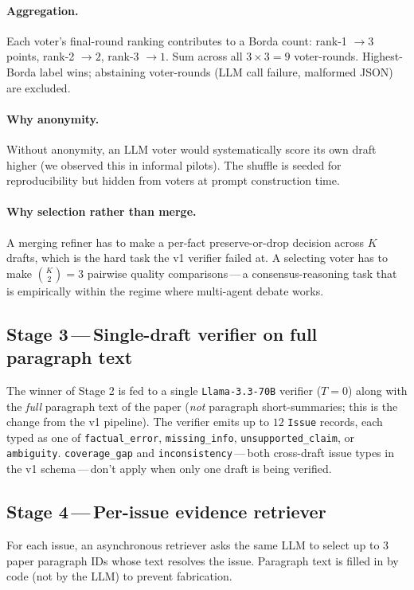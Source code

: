 \documentclass[11pt,a4paper]{article}
\begin{document}
\paragraph{Aggregation.}
Each voter's final-round ranking contributes to a Borda count: rank-1
$\to 3$ points, rank-2 $\to 2$, rank-3 $\to 1$. Sum across all
$3 \times 3 = 9$ voter-rounds. Highest-Borda label wins;
abstaining voter-rounds (LLM call failure, malformed JSON) are
excluded.

\paragraph{Why anonymity.}
Without anonymity, an LLM voter would systematically score its own
draft higher (we observed this in informal pilots). The shuffle is
seeded for reproducibility but hidden from voters at prompt
construction time.

\paragraph{Why selection rather than merge.}
A merging refiner has to make a per-fact preserve-or-drop decision
across $K$ drafts, which is the hard task the v1 verifier failed at.
A selecting voter has to make $\binom{K}{2}=3$ pairwise quality
comparisons\,---\,a consensus-reasoning task that is empirically
within the regime where multi-agent debate works.

\subsection*{Stage 3\,---\,Single-draft verifier on full paragraph text}
The winner of Stage 2 is fed to a single \texttt{Llama-3.3-70B}
verifier ($T\!=\!0$) along with the \emph{full} paragraph text of the
paper (\emph{not} paragraph short-summaries; this is the change from
the v1 pipeline). The verifier emits up to $12$ \texttt{Issue}
records, each typed as one of \texttt{factual\_error},
\texttt{missing\_info}, \texttt{unsupported\_claim}, or
\texttt{ambiguity}. \texttt{coverage\_gap} and
\texttt{inconsistency}\,---\,both cross-draft issue types in the v1
schema\,---\,don't apply when only one draft is being verified.

\subsection*{Stage 4\,---\,Per-issue evidence retriever}
For each issue, an asynchronous retriever asks the same LLM to
select up to 3 paper paragraph IDs whose text resolves the issue.
Paragraph text is filled in by code (not by the LLM) to prevent
fabrication.
\end{document}
